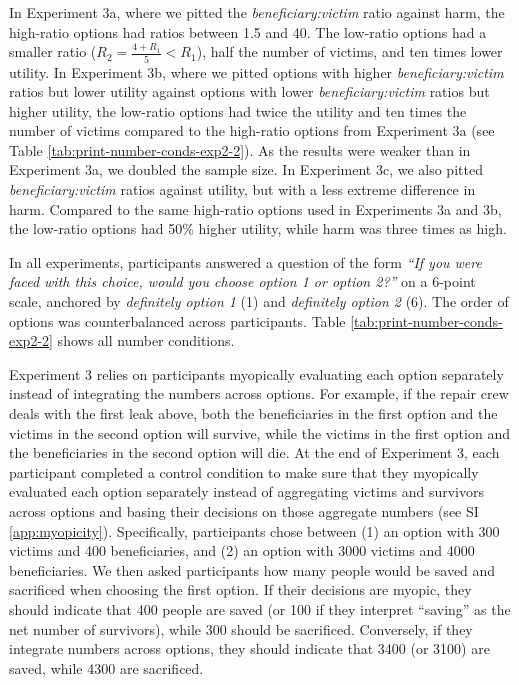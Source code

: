\documentclass[
]{article}
\begin{document}
In Experiment 3a, where we pitted the \emph{beneficiary:victim} ratio against harm, the high-ratio options had ratios between 1.5 and 40. The low-ratio options had a smaller ratio (\(R_2 = \frac{4 + R_1}{5} < R_1\)), half the number of victims, and ten times lower utility. In Experiment 3b, where we pitted options with higher \emph{beneficiary:victim} ratios but lower utility against options with lower \emph{beneficiary:victim} ratios but higher utility, the low-ratio options had twice the utility and ten times the number of victims compared to the high-ratio options from Experiment 3a (see Table \ref{tab:print-number-conds-exp2-2}). As the results were weaker than in Experiment 3a, we doubled the sample size. In Experiment 3c, we also pitted \emph{beneficiary:victim} ratios against utility, but with a less extreme difference in harm. Compared to the same high-ratio options used in Experiments 3a and 3b, the low-ratio options had 50\% higher utility, while harm was three times as high.

In all experiments, participants answered a question of the form \emph{``If you were faced with this choice, would you choose option 1 or option 2?''} on a 6-point scale, anchored by \emph{definitely option 1} (1) and \emph{definitely option 2} (6). The order of options was counterbalanced across participants. Table \ref{tab:print-number-conds-exp2-2} shows all number conditions.

Experiment 3 relies on participants myopically evaluating each option separately instead of integrating the numbers across options. For example, if the repair crew deals with the first leak above, both the beneficiaries in the first option and the victims in the second option will survive, while the victims in the first option and the beneficiaries in the second option will die. At the end of Experiment 3, each participant completed a control condition to make sure that they myopically evaluated each option separately instead of aggregating victims and survivors across options and basing their decisions on those aggregate numbers (see SI \ref{app:myopicity}). Specifically, participants chose between (1) an option with 300 victims and 400 beneficiaries, and (2) an option with 3000 victims and 4000 beneficiaries. We then asked participants how many people would be saved and sacrificed when choosing the first option. If their decisions are myopic, they should indicate that 400 people are saved (or 100 if they interpret ``saving'' as the net number of survivors), while 300 should be sacrificed. Conversely, if they integrate numbers across options, they should indicate that 3400 (or 3100) are saved, while 4300 are sacrificed.
\end{document}
